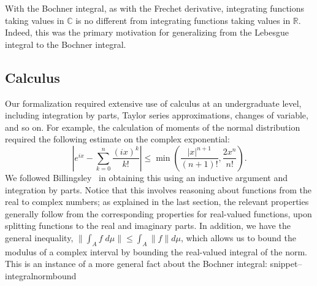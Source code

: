 \documentclass{svjour3}
\newcommand{\RR}{\mathbb{R}}
\newcommand{\CC}{\mathbb{C}}
\newcommand{\Snippet}[1]{\csname snippet--#1\endcsname}
\begin{document}
With the Bochner integral, as with the Frechet derivative, integrating functions taking values in $\CC$ is no different from integrating functions taking values in $\RR$. Indeed, this was the primary motivation for generalizing from the Lebesgue integral to the Bochner integral.

\subsection{Calculus}
\label{subsection:calculus}

Our formalization required extensive use of calculus at an undergraduate level, including integration by parts, Taylor series approximations, changes of variable, and so on. For example, the calculation of moments of the normal distribution required the following estimate on the complex exponential:
\[
 \left| e^{ix} - \sum_{k=0}^n \frac{(ix)^k}{k!} \right| \le \min\left(\frac{|x|^{n+1}}{(n+1)!}, \frac{2 x^n}{n!}\right).
\]
We followed Billingsley~\cite[Section 26]{billingsley:95} in obtaining this using an inductive argument and integration by parts. Notice that this involves reasoning about functions from the real to complex numbers; as explained in the last section, the relevant properties generally follow from the corresponding properties for real-valued functions, upon splitting functions to the real and imaginary parts. 
In addition, we have the general inequality, $\| \int_A f \; d\mu \| \le \int_A \| f \| d\mu$, which allows us to bound the modulus of a complex interval by bounding the real-valued integral of the norm. This is an instance of a more general fact about the Bochner integral:
\Snippet{integralnormbound}
\end{document}
